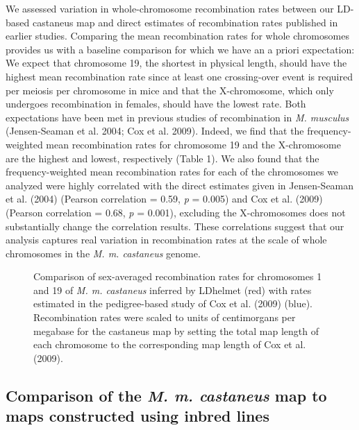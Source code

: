 We assessed variation in whole-chromosome recombination rates between our LD-based castaneus map and direct estimates of recombination rates published in earlier studies. Comparing the mean recombination rates for whole chromosomes provides us with a baseline comparison for which we have an a priori expectation: We expect that chromosome 19, the shortest in physical length, should have the highest mean recombination rate since at least one crossing-over event is required per meiosis per chromosome in mice and that the X-chromosome, which only undergoes recombination in females, should have the lowest rate. Both expectations have been met in previous studies of recombination in \emph{M. musculus} (Jensen-Seaman et al. 2004; Cox et al. 2009). Indeed, we find that the frequency-weighted mean recombination rates for chromosome 19 and the X-chromosome are the highest and lowest, respectively (Table 1). We also found that the frequency-weighted mean recombination rates for each of the chromosomes we analyzed were highly correlated with the direct estimates given in Jensen-Seaman et al. (2004) (Pearson correlation = 0.59, \emph{p} = 0.005) and Cox et al. (2009) (Pearson correlation = 0.68, \emph{p} = 0.001), excluding the X-chromosomes does not substantially change the correlation results. These correlations suggest that our analysis captures real variation in recombination rates at the scale of whole chromosomes in the \emph{M. m. castaneus} genome. 

\begin{figure}[h]
   \centering      
   \noindent{}
 \caption[Comparison of LD-based and pedigree-based recombination maps]{Comparison of sex-averaged recombination rates for chromosomes 1 and 19 of \emph{M. m. castaneus} inferred by LDhelmet (red) with rates estimated in the pedigree-based study of Cox et al. (2009) (blue). Recombination rates were scaled to units of centimorgans per megabase for the castaneus map by setting the total map length of each chromosome to the corresponding map length of Cox et al. (2009).}
\end{figure}

\linespread{1}

\linespread{2}


\subsection{Comparison of the \emph{M. m. castaneus} map to maps constructed using inbred lines}
 
